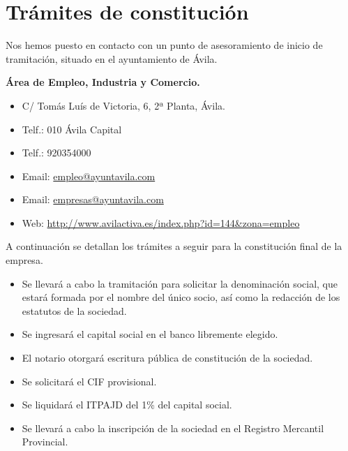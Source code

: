 \chapter{Trámites de constitución}
\label{chap:tramites}

Nos hemos puesto en contacto con un punto de asesoramiento de inicio de tramitación, situado en el ayuntamiento de Ávila.
 
\textbf{Área de Empleo, Industria y Comercio.} 
\begin{itemize}[label={}]
\item C/ Tomás Luís de Victoria, 6, 2ª Planta, Ávila.
\item Telf.: 010 Ávila Capital
\item Telf.: 920354000
\item Email: \href{mailto:empleo@ayuntavila.com}{empleo@ayuntavila.com} 
\item Email: \href{mailto:empresas@ayuntavila.com}{empresas@ayuntavila.com}
\item Web: \url{http://www.avilactiva.es/index.php?id=144&zona=empleo}
\end{itemize}

A continuación se detallan los trámites a seguir para la constitución final de la empresa.

\begin{itemize}
\item Se llevará a cabo la tramitación para solicitar la denominación social, que estará formada por el nombre del único socio, así como la redacción de los estatutos de la sociedad.
\item Se ingresará el capital social en el banco libremente elegido.
\item El notario otorgará escritura pública de constitución de la sociedad.
\item Se solicitará el CIF provisional.
\item Se liquidará el ITPAJD del 1\% del capital social.
\item Se llevará a cabo la inscripción de la sociedad en el Registro Mercantil Provincial.
\end{itemize}
